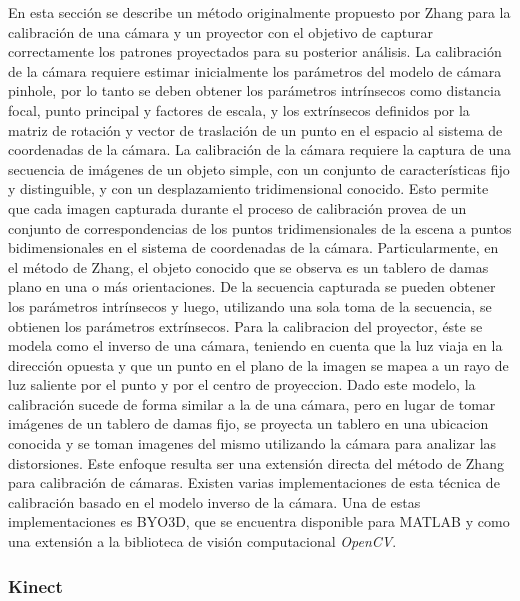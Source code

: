En esta sección se describe un método originalmente propuesto por Zhang\cite{Zhang} para la calibración de una cámara y un proyector con el objetivo de capturar correctamente los patrones proyectados para su posterior análisis.
La calibración de la cámara requiere estimar inicialmente los parámetros del modelo de cámara pinhole, por lo tanto se deben obtener los parámetros intrínsecos como distancia focal, punto principal y factores de escala, y los extrínsecos definidos por la matriz de rotación y vector de traslación de un punto en el espacio al sistema de coordenadas de la cámara.
La calibración de la cámara requiere la captura de una secuencia de imágenes de un objeto simple, con un conjunto de características fijo y distinguible, y con un desplazamiento tridimensional conocido. Esto permite que cada imagen capturada durante el proceso de calibración provea de un conjunto de correspondencias de los puntos tridimensionales de la escena a puntos bidimensionales en el sistema de coordenadas de la cámara. Particularmente, en el método de Zhang, el objeto conocido que se observa es un tablero de damas plano en una o más orientaciones. De la secuencia capturada se pueden obtener los parámetros intrínsecos y luego, utilizando una sola toma de la secuencia, se obtienen los parámetros extrínsecos.
Para la calibracion del proyector, éste se modela como el inverso de una cámara, teniendo en cuenta que la luz viaja en la dirección opuesta y que un punto en el plano de la imagen se mapea a un rayo de luz saliente por el punto y por el centro de proyeccion. Dado este modelo, la calibración sucede de forma similar a la de una cámara, pero en lugar de tomar imágenes de un tablero de damas fijo, se proyecta un tablero en una ubicacion conocida y se toman imagenes del mismo utilizando la cámara para analizar las distorsiones. Este enfoque resulta ser una extensión directa del método de Zhang para calibración de cámaras.
Existen varias implementaciones de esta técnica de calibración basado en el modelo inverso de la cámara. Una de estas implementaciones es BYO3D\cite{BYO3D}, que se encuentra disponible para MATLAB\cite{MATLAB} y como una extensión a la biblioteca de visión computacional \emph{OpenCV}\cite{OpenCV}.

\subsubsection{Kinect}

